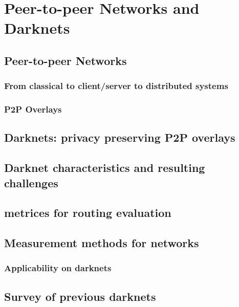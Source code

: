 \chapter{Peer-to-peer Networks and Darknets}

\section{Peer-to-peer Networks}

\subsection{From classical to client/server to distributed systems}

\subsection{P2P Overlays}


\section{Darknets: privacy preserving P2P overlays}


\section{Darknet characteristics and resulting challenges}


\section{metrices for routing evaluation}


\section{Measurement methods for networks}

\subsection{Applicability on darknets}


\section{Survey of previous darknets}


